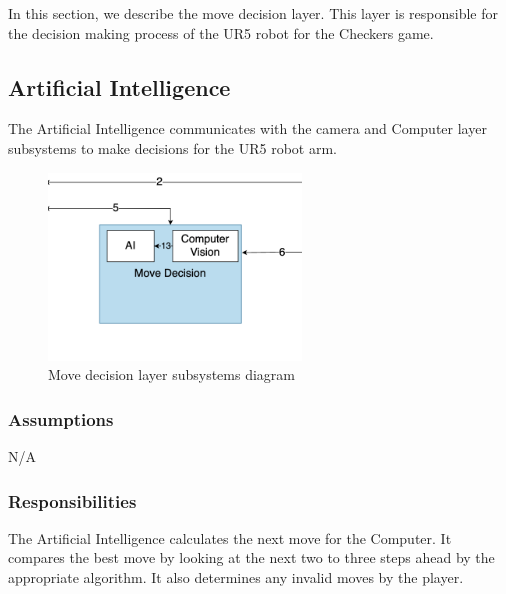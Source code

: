 In this section, we describe the move decision layer. This layer is responsible for the decision making process of the UR5 robot for the Checkers game.
\subsection{Artificial Intelligence}
The Artificial Intelligence communicates with the camera and Computer layer subsystems to make decisions for the UR5 robot arm.
\begin{figure}[h!]
	\centering
 	\includegraphics[width=0.60\textwidth]{images/Screenshot 2022-11-13 at 6.09.50 PM.png}
 \caption{Move decision layer subsystems diagram}
\end{figure}

\subsubsection{Assumptions}
N/A

\subsubsection{Responsibilities}
The Artificial Intelligence calculates the next move for the Computer. It compares the best move by looking at the next two to three steps ahead by the appropriate algorithm. It also determines any invalid moves by the player.  

